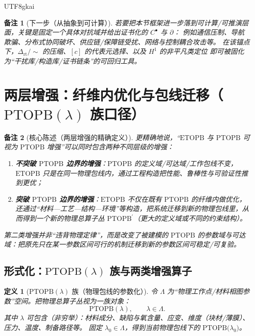 \documentclass[12pt]{article}
\newtheorem{definition}{定义}[section]
\newtheorem{remark}{备注}[section]
\newcommand{\PTOPB}{\ensuremath{\mathrm{PTOPB}}}
\newcommand{\ETOPB}{\ensuremath{\mathrm{ETOPB}}}
\newcommand{\DeltaRT}{\ensuremath{\Delta_{\mathrm{rt}}}}
\begin{document}
\begin{CJK*}{UTF8}{gkai}
\begin{remark}[下一步（从抽象到可计算）]
若要把本节框架进一步落到可计算/可推演层面，关键是固定一个具体对抗域并给出证书化的 $C^\bullet$ 与 $\partial$：
例如通信压制、导航欺骗、分布式协同破坏、供应链/保障链受扰、网络与控制耦合攻击等。
在该锚点下，$\DeltaRT/\!\sim$ 的压缩、$[c]$ 的代表元选择、以及 $H^1$ 的非平凡类定位
即可被固化为“干扰库/构造库/证书链条”的可回归工具。
\end{remark}

\section{两层增强：纤维内优化与包线迁移（\texorpdfstring{$\PTOPB(\lambda)$}{PTOPB(lambda)} 族口径）}
\label{sec:two-level-augmentation}

\begin{remark}[核心陈述（两层增强的精确定义）]
更精确地说，“\ETOPB{} 与 \PTOPB{} 可视为 \PTOPB{} 增强”可以同时包含两种不同层级的增强：
\begin{enumerate}
  \item \textbf{不突破 \PTOPB{} 边界的增强}：\PTOPB{} 的定义域/可达域/工作包线不变，\ETOPB{} 只是在同一物理包线内，通过工程构造把性能、鲁棒性与可验证性推到更优；
  \item \textbf{突破 \PTOPB{} 边界的增强}：\ETOPB{} 不仅在既有 \PTOPB{} 的纤维内做优化，还通过“材料—工艺—结构—环境”等构造，把系统迁移到新的物理包线里，从而得到一个新的物理总算子丛
    $\PTOPB^{\prime}$（更大的定义域或不同的约束结构）。
\end{enumerate}
第二类增强并非“违背物理定律”，而是改变了被建模的 \PTOPB{} 的参数域与可达域：把原先只在某一参数区间可行的机制迁移到新的参数区间可稳定/可复验。
\end{remark}

\subsection{形式化：\texorpdfstring{$\PTOPB(\lambda)$}{PTOPB(lambda)} 族与两类增强算子}
\label{sec:ptopb-family-and-two-operators}

\begin{definition}[$\PTOPB(\lambda)$ 族（物理包线的参数化）]
令 $\Lambda$ 为“物理工作点/材料相图参数”空间。把物理总算子丛视为一族对象：
\[
  \PTOPB(\lambda),\qquad \lambda\in\Lambda.
\]
其中 $\lambda$ 可包含（非穷举）：材料成分、缺陷与氧含量、应变、维度（块材/薄膜）、压力、温度、制备路径等。
固定 $\lambda_0\in\Lambda$，得到当前物理包线下的 $\PTOPB\bigl(\lambda_0\bigr)$。
\end{definition}


\end{CJK*}
\end{document}
